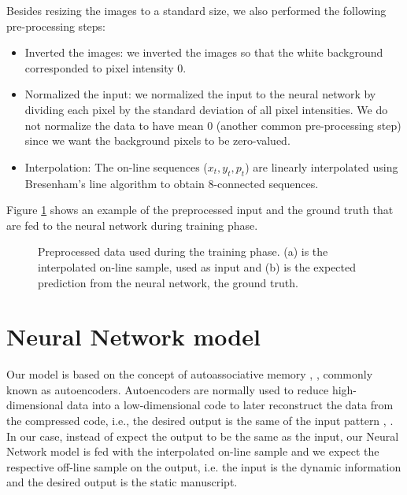 Besides resizing the images to a standard size, we also
performed the following pre-processing steps:
\begin{itemize}
\item Inverted the images: we inverted the images so that the white background corresponded to pixel intensity
0. 
\item Normalized the input: we normalized the input to the
neural network by dividing each pixel by the standard
deviation of all pixel intensities. We do not normalize the data to have mean 0 (another common pre-processing step) since we want the
background pixels to be zero-valued.
\item Interpolation: The on-line sequences ($x_{t}, y_{t}, p_{t}$) are linearly interpolated using Bresenham's line algorithm to obtain 8-connected sequences.
\end{itemize}

Figure \ref{fig_ironoff} shows an example of the preprocessed input and the ground truth that are fed to the neural network during training phase.


\begin{figure}[!htpb]
\centering
\hspace*{0.5in} %
\caption{Preprocessed data used during the training phase. (a) is the interpolated on-line sample, used as input and (b) is the expected prediction from the neural network, the ground truth. } \label{fig_ironoff}
\end{figure}



\section{Neural Network model}

Our model is based on the concept of autoassociative memory \cite{jensen1996physiologically}, \cite{weinberger2004specific}, commonly known as autoencoders. Autoencoders are normally used to reduce high-dimensional data into a low-dimensional code to later reconstruct the data from the compressed code, i.e., the desired output is the same of the input pattern \cite{kramer1991nonlinear}, \cite{hinton2006reducing}. In our case, instead of expect the output to be the same as the input, our Neural Network model is fed with the interpolated on-line sample and we expect the respective off-line sample on the output, i.e. the input is the dynamic information and the desired output is the static manuscript.

